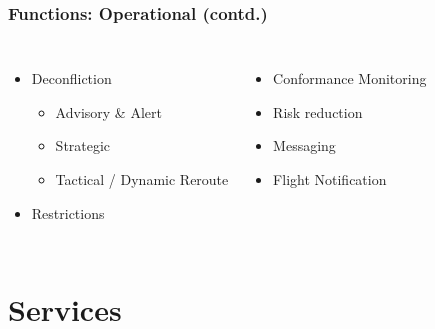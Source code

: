 \documentclass[usenames,dvipsnames,aspectratio=169,serif]{beamer}
\begin{document}
\begin{frame}
   \frametitle{Functions: Operational (contd.)}
   \begin{columns}[t] %

      \begin{itemize}
         \item Deconfliction
            \begin{itemize}
               \item Advisory \& Alert
               \item Strategic
               \item Tactical / Dynamic Reroute
            \end{itemize}
         \item Restrictions
      \end{itemize}

      \begin{itemize}
         \item Conformance Monitoring
         \item Risk reduction
         \item Messaging
         \item Flight Notification
      \end{itemize}
   \end{columns}

\end{frame}

\section{Services}
\end{document}

